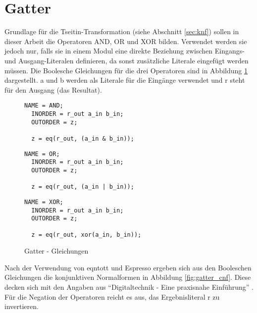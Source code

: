 \section{Gatter}
\label{sec:knf:gatter}

Grundlage für die Tseitin-Transformation (siehe Abschnitt \ref{sec:knf}) sollen in dieser Arbeit die Operatoren AND, OR und XOR bilden. Verwendet werden sie jedoch
nur, falls sie in einem Modul eine direkte Beziehung zwischen Eingangs- und Ausgang-Literalen definieren, da sonst zusätzliche Literale eingefügt werden müssen.
Die Boolesche Gleichungen für die drei Operatoren sind in Abbildung \ref{fig:gatter_equations} dargestellt. a und b werden als Literale für die Eingänge verwendet
und r steht für den Ausgang (das Resultat).

\begin{figure}[!h]
  \centering
  \begin{minipage}[c]{4.85cm}
    \begin{lstlisting}[]
  NAME = AND;
  INORDER = r_out a_in b_in;
  OUTORDER = z;

  z = eq(r_out, (a_in & b_in));
    \end{lstlisting}
  \end{minipage}
  \begin{minipage}[c]{4.85cm}
    \begin{lstlisting}[]
  NAME = OR;
  INORDER = r_out a_in b_in;
  OUTORDER = z;

  z = eq(r_out, (a_in | b_in));
    \end{lstlisting}
  \end{minipage}
  \begin{minipage}[c]{5.1cm}
    \begin{lstlisting}[]
  NAME = XOR;
  INORDER = r_out a_in b_in;
  OUTORDER = z;

  z = eq(r_out, xor(a_in, b_in));
    \end{lstlisting}
  \end{minipage}
  \caption{Gatter - Gleichungen}
  \label{fig:gatter_equations}
\end{figure}

Nach der Verwendung von eqntott und Espresso ergeben sich aus den Booleschen Gleichungen die konjunktiven Normalformen in Abbildung \ref{fig:gatter_cnf}.
Diese decken sich mit den Angaben aus "`Digitaltechnik - Eine praxisnahe Einführung"' \cite[164]{digitaltechnik}. Für die Negation der Operatoren reicht es aus, das Ergebnisliteral r zu invertieren.

